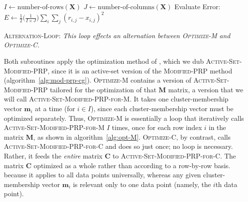 \begin{algorithm}[th]
$I \gets \text{number-of-rows}(\textbf{X})$\;
$J \gets \text{number-of-columns}(\textbf{X})$\;
 Evaluate Error: $E \gets \frac{1}{2} \big(\frac{1}{I\times J}\big) \sum_i \sum_j (r_{i,j} - x_{i,j})^2$\;\label{line:init-E-alt} 
\caption{\textsc{Alternation-Loop}: \textit{This loop effects an alternation between \textsc{Optimize-M} and \textsc{Optimize-C}.}}
\label{alg:m-and-c}
\end{algorithm}

Both subroutines apply the 
optimization method of \citet{cheng-and-li:2012}, which we dub
\textsc{Active-Set-Modified-PRP}, since it is an active-set version of the 
\textsc{Modified-PRP} method (algorithm~\ref{alg:mod-prp-cg}). 
\textsc{Optimize-M} contains a version of \textsc{Active-Set-Modified-PRP} tailored for
 the optimization of that $\textbf{M}$ matrix, a version that we will call \textsc{Active-Set-Modified-PRP-for-M}.
It takes one cluster-membership vector $\textbf{m}_i$ at a time (for $i \in I$), 
since each cluster-membership vector must be optimized separately. 
Thus, \textsc{Optimize-M} is essentially a loop that iteratively calls 
\textsc{Active-Set-Modified-PRP-for-M} $I$ times, once for each row index $i$ in 
the matrix $\textbf{M}$, as shown in algorithm~\ref{alg:opt-M}.
\textsc{Optimize-C}, by contrast, calls \textsc{Active-Set-Modified-PRP-for-C} and does so just once; no loop is necessary. 
Rather, it feeds the \emph{entire} matrix $\textbf{C}$ to 
\textsc{Active-Set-Modified-PRP-for-C}. The matrix $\textbf{C}$ optimized 
as a whole rather than according to a row-by-row basis.
because it applies to all data points universally, 
whereas any given cluster-membership vector $\textbf{m}_i$ is relevant only to one 
data point (namely, the $i$th data point).

